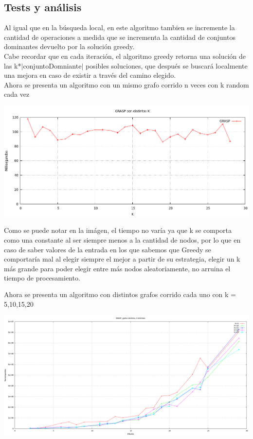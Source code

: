 \subsection{Tests y análisis}
Al igual que en la búsqueda local, en este algoritmo tambien se incremente la cantidad de operaciones a medida
que se incrementa la cantidad de conjuntos dominantes devuelto por la solución greedy.\\
Cabe recordar que en cada iteración, el algoritmo greedy retorna una solución de las k*$|$conjuntoDomniante$|$ posibles soluciones, que después se buscará localmente una mejora en caso de existir a través del camino elegido.\\
Ahora se presenta un algoritmo con un mismo grafo corrido n veces con k random cada vez

\begin{center}
\includegraphics[width=15cm]{./graficos/GRASP_distintosK.png}
\end{center}

Como se puede notar en la imágen, el tiempo no varía ya que k se comporta como una constante al ser siempre menos a la cantidad de nodos, por lo que en caso de saber valores de la entrada en los que sabemos
que Greedy se comportaría mal al elegir siempre el mejor a partir de su estrategia, elegir un k más grande para poder elegir entre más nodos aleatoriamente, no arruina el tiempo de procesamiento.

Ahora se presenta un algoritmo con distintos grafos corrido cada uno con k = 5,10,15,20

\begin{center}
\includegraphics[width=15cm]{./graficos/GRASP_distGrafos_distK.png}
\end{center}

